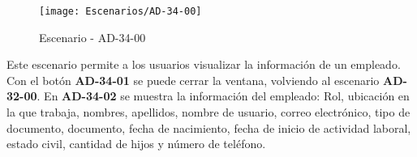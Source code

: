 \begin{figure}[H]
\centering
\texttt{[image: Escenarios/AD-34-00]}
\caption{Escenario - AD-34-00}
\label{fig:AD-34-00}
\end{figure}

Este escenario permite a los usuarios visualizar la información de un empleado. Con el botón \textbf{AD-34-01} se puede cerrar la ventana, volviendo al escenario \textbf{AD-32-00}. En \textbf{AD-34-02} se muestra la información del empleado: Rol, ubicación en la que trabaja, nombres, apellidos, nombre de usuario, correo electrónico, tipo de documento, documento, fecha de nacimiento, fecha de inicio de actividad laboral, estado civil, cantidad de hijos y número de teléfono.
\clearpage
